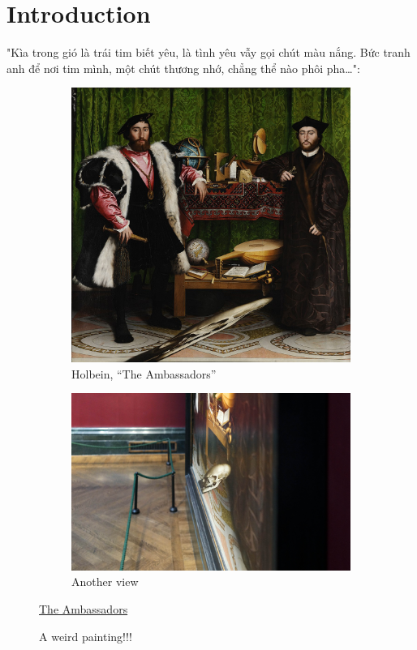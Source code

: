 \documentclass{article}
\begin{document}
\section{Introduction}
"Kìa trong gió là trái tim biết yêu, là tình yêu vẫy gọi chút màu nắng. Bức tranh anh để nơi tim mình, một chút thương nhớ, chẳng thể nào phôi pha\ldots":\\
\begin{figure}[ht!]
    \centering
    \begin{subfigure}[b]{0.7\linewidth}             \includegraphics[width=\linewidth]{holbein.jpg}
    \caption{Holbein, “The Ambassadors”}
    \end{subfigure}
    
    \begin{subfigure}[b]{0.7\linewidth}           \includegraphics[width=\linewidth]{HolbeinSkullCorrected.jpg}
    \caption{Another view}
    \end{subfigure}
    
    \caption{A weird painting!!! 
    }\href{https://en.wikipedia.org/wiki/The_Ambassadors_%28Holbein%29}{The Ambassadors}
    \label{fig1}
\end{figure}
\end{document}
